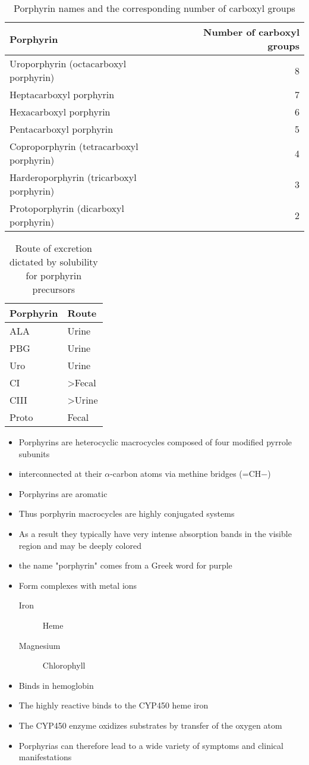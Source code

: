 \documentclass{scrartcl}
\begin{document}
\begin{table}[htbp]
\caption{\label{tab:org5c7eeab}
Porphyrin names and the corresponding number of carboxyl groups}
\centering
\begin{tabular}{lr}
Porphyrin & Number of carboxyl groups\\
\hline
Uroporphyrin (octacarboxyl porphyrin) & 8\\
Heptacarboxyl porphyrin & 7\\
Hexacarboxyl porphyrin & 6\\
Pentacarboxyl porphyrin & 5\\
Coproporphyrin (tetracarboxyl porphyrin) & 4\\
Harderoporphyrin (tricarboxyl porphyrin) & 3\\
Protoporphyrin (dicarboxyl porphyrin) & 2\\
\end{tabular}
\end{table}


\begin{table}[htbp]
\caption{\label{tab:orgcfbbfe2}
Route of excretion dictated by solubility for porphyrin precursors}
\centering
\begin{tabular}{ll}
Porphyrin & Route\\
\hline
ALA & Urine\\
PBG & Urine\\
Uro & Urine\\
CI & >Fecal\\
CIII & >Urine\\
Proto & Fecal\\
\end{tabular}
\end{table}

\begin{itemize}
\item Porphyrins are heterocyclic macrocycles composed of four modified
pyrrole subunits
\item interconnected at their \(\alpha\)-carbon atoms via methine bridges
(=CH−)
\item Porphyrins are aromatic
\item Thus porphyrin macrocycles are highly conjugated systems
\item As a result they typically have very intense absorption bands in the
visible region and may be deeply colored
\item the name "porphyrin" comes from a Greek word for purple

\item Form complexes with metal ions
\begin{description}
\item[{Iron}] Heme
\item[{Magnesium}] Chlorophyll
\end{description}
\item Binds in hemoglobin
\item The highly reactive binds to the CYP450 heme iron
\item The CYP450 enzyme oxidizes substrates by transfer of the oxygen atom
\item Porphyrias can therefore lead to a wide variety of symptoms and
clinical manifestations
\end{itemize}
\end{document}
